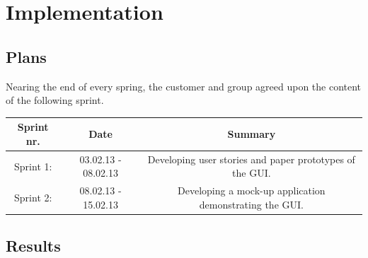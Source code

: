 \chapter{Implementation}
\section{Plans}


Nearing the end of every spring, the customer and group agreed upon the content of the following sprint. 


\begin{tabular}{|c|c|c|}
\hline
Sprint nr. & Date & Summary\\
\hline
Sprint 1: & 03.02.13 - 08.02.13 & Developing user stories and paper prototypes of the GUI.\\ 
\hline
Sprint 2: & 08.02.13 - 15.02.13 & Developing a mock-up application demonstrating the GUI.\\
\hline

\end{tabular} 

 

\section{Results}
